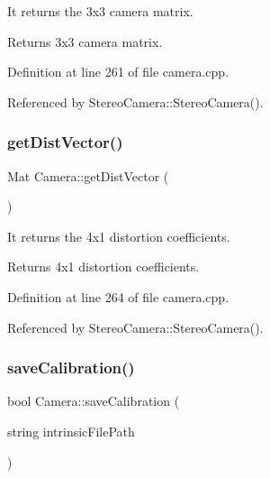 It returns the 3x3 camera matrix. 

\begin{DoxyReturn}{Returns}
3x3 camera matrix. 
\end{DoxyReturn}


Definition at line 261 of file camera.\+cpp.


\begin{DoxyCode}{0}

\end{DoxyCode}


Referenced by Stereo\+Camera\+::\+Stereo\+Camera().

\mbox{\label{classCamera_a1cd15bc4fd4f0405c7e047af632b9353}} 
\subsubsection{\texorpdfstring{getDistVector()}{getDistVector()}}
{\footnotesize\ttfamily Mat Camera\+::get\+Dist\+Vector (\begin{DoxyParamCaption}{ }\end{DoxyParamCaption})}



It returns the 4x1 distortion coefficients. 

\begin{DoxyReturn}{Returns}
4x1 distortion coefficients. 
\end{DoxyReturn}


Definition at line 264 of file camera.\+cpp.


\begin{DoxyCode}{0}

\end{DoxyCode}


Referenced by Stereo\+Camera\+::\+Stereo\+Camera().

\mbox{\label{classCamera_a979043e0e738bf3858de6476e12b5a67}} 
\subsubsection{\texorpdfstring{saveCalibration()}{saveCalibration()}}
{\footnotesize\ttfamily bool Camera\+::save\+Calibration (\begin{DoxyParamCaption}\item[{string}]{intrinsic\+File\+Path }\end{DoxyParamCaption})}



